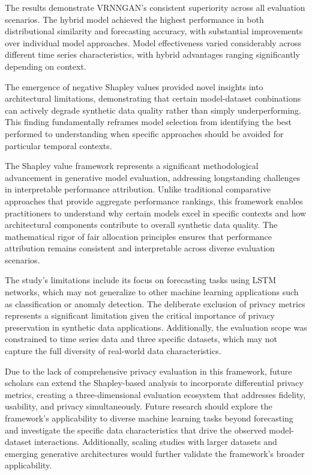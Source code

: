 \documentclass{article}
\begin{document}
The results demonstrate VRNNGAN's consistent superiority across all evaluation scenarios. The hybrid model achieved the highest performance in both distributional similarity and forecasting accuracy, with substantial improvements over individual model approaches. Model effectiveness varied considerably across different time series characteristics, with hybrid advantages ranging significantly depending on context. 

The emergence of negative Shapley values provided novel insights into architectural limitations, demonstrating that certain model-dataset conbinations can actively degrade synthetic data quality rather than simply underperforming. This finding fundamentally reframes model selection from identifying the best performed to understanding when specific approaches should be avoided for particular temporal contexts.

The Shapley value framework represents a significant methodological advancement in generative model evaluation, addressing longstanding challenges in interpretable performance attribution. Unlike traditional comparative approaches that provide aggregate performance rankings, this framework enables practitioners to understand why certain models excel in specific contexts and how architectural components contribute to overall synthetic data quality. The mathematical rigor of fair allocation principles ensures that performance attribution remains consistent and interpretable across diverse evaluation scenarios.

The study's limitations include its focus on forecasting tasks using LSTM networks, which may not generalize to other machine learning applications such as classification or anomaly detection. The deliberate exclusion of privacy metrics represents a significant limitation given the critical importance of privacy preservation in synthetic data applications. Additionally, the evaluation scope was constrained to time series data and three specific datasets, which may not capture the full diversity of real-world data characteristics.

Due to the lack of comprehensive privacy evaluation in this framework, future scholars can extend the Shapley-based analysis to incorporate differential privacy metrics, creating a three-dimensional evaluation ecosystem that addresses fidelity, usability, and privacy simultaneously. Future research should explore the framework's applicability to diverse machine learning tasks beyond forecasting and investigate the specific data characteristics that drive the observed model-dataset interactions. Additionally, scaling studies with larger datasets and emerging generative architectures would further validate the framework's broader applicability.
\end{document}
